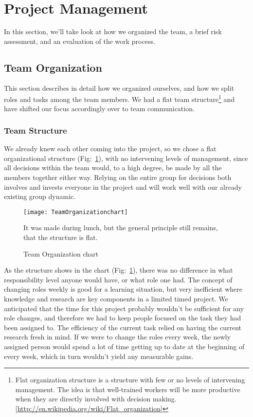 \section{Project Management}\label{Project Management} 
    In this section, we'll take look at how we organized the team, a brief risk assessment, and an evaluation of the work process. 
    
    \subsection{Team Organization}\label{Team Organization} 
        This section describes in detail how we organized ourselves, and how we split roles and tasks among the team members. We had a flat team structure\footnote{Flat organization structure is a structure with few or no levels of intervening management. The idea is that well-trained workers will be more productive when they are directly involved with decision making. [\url{http://en.wikipedia.org/wiki/Flat_organization}]}  and have shifted our focus accordingly over to team communication. 
    
    \subsubsection{Team Structure}\label{Team Structure}
    We already knew each other coming into the project, so we chose a flat organizational structure (Fig:~\ref{fig:TeamOrganizationchart}), with no intervening levels of management, since all decisions within the team would, to a high degree, be made by all the members together either way. Relying on the entire group for decisions both involves and invests everyone in the project and will work well with our already existing group dynamic.

    \begin{figure}[H]
        \centering
        \texttt{[image: TeamOrganizationchart]}
        \caption{Team Organization chart}
        It was made during lunch, but the general principle still remains, that the structure is flat.
        \label{fig:TeamOrganizationchart}
    \end{figure}
    
    As the structure shows in the chart (Fig:~\ref{fig:TeamOrganizationchart}), there was no difference in what responsibility level anyone would have, or what role one had. The concept of changing roles weekly is good for a learning situation, but very inefficient where knowledge and research are key components in a limited timed project. We anticipated that the time for this project probably wouldn't be sufficient for any role changes, and therefore we had to keep people focused on the task they had been assigned to. The efficiency of the current task relied on having the current research fresh in mind. If we were to change the roles every week, the newly assigned person would spend a lot of time getting up to date at the beginning of every week, which in turn wouldn't yield any measurable gains. 
    
